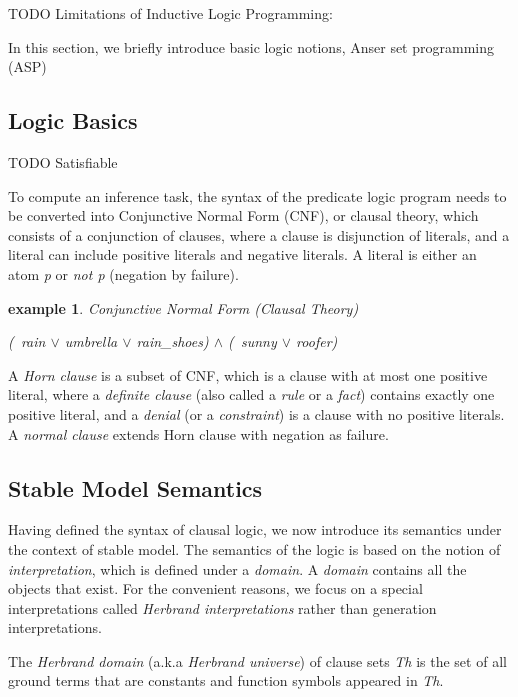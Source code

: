\documentclass[12pt,twoside]{report}
\newtheorem{examp}{example}[section]
\begin{document}

TODO Limitations of Inductive Logic Programming:

In this section, we briefly introduce basic logic notions, Anser set programming (ASP)

\subsection{Logic Basics}

TODO Satisfiable

To compute an inference task, the syntax of the predicate logic program needs to be converted into Conjunctive Normal Form (CNF), or clausal theory, which consists of a conjunction of clauses, where a clause is disjunction of literals, and a literal can include positive literals and negative literals. A literal is either an atom \textit{p} or \textit{not p} (negation by failure).

\begin{examp} \normalfont Conjunctive Normal Form (Clausal Theory)
\begin{center}
 \textit{(~rain $\vee$ umbrella $\vee$ rain\_shoes) $\wedge$ (~sunny $\vee$ roofer)}
\end{center}
\end{examp}

A \textit{Horn clause} is a subset of CNF, which is a clause with at most one positive literal, where a \textit{definite clause} (also called a \textit{rule} or a \textit{fact}) contains exactly one positive literal, and a \textit{denial} (or a \textit{constraint}) is a clause with no positive literals.
A \textit{normal clause} extends Horn clause with negation as failure.
\\

\subsection{Stable Model Semantics}

Having defined the syntax of clausal logic, we now introduce its semantics under the context of stable model. The semantics of the logic is based on the notion of \textit{interpretation}, which is defined under a \textit{domain}. A \textit{domain} contains all the objects that exist.  For the convenient reasons, we focus on a special interpretations called \textit{Herbrand interpretations} rather than generation interpretations.

The \textit{Herbrand domain} (a.k.a \textit{Herbrand universe}) of clause sets \textit{Th} is the set of all ground terms that are constants and function symbols appeared in \textit{Th}.
\end{document}
